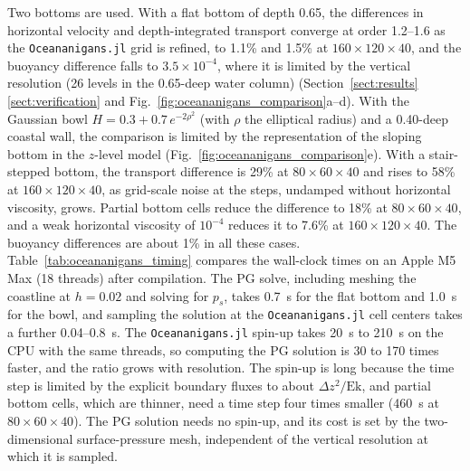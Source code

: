 \documentclass{ametsocV6.2}
\begin{document}
Two bottoms are used.
With a flat bottom of depth 0.65, the differences in horizontal velocity and depth-integrated transport converge at order 1.2--1.6 as the \texttt{Oceananigans.jl} grid is refined, to 1.1\% and 1.5\% at $160 \times 120 \times 40$, and the buoyancy difference falls to $3.5 \times 10^{-4}$, where it is limited by the vertical resolution (26 levels in the 0.65-deep water column) (Section~\ref{sect:results}\ref{sect:verification} and Fig.~\ref{fig:oceananigans_comparison}a--d).
With the Gaussian bowl $H = 0.3 + 0.7\, e^{-2\rho^2}$ (with $\rho$ the elliptical radius) and a 0.40-deep coastal wall, the comparison is limited by the representation of the sloping bottom in the $z$-level model (Fig.~\ref{fig:oceananigans_comparison}e).
With a stair-stepped bottom, the transport difference is 29\% at $80 \times 60 \times 40$ and rises to 58\% at $160 \times 120 \times 40$, as grid-scale noise at the steps, undamped without horizontal viscosity, grows.
Partial bottom cells reduce the difference to 18\% at $80 \times 60 \times 40$, and a weak horizontal viscosity of $10^{-4}$ reduces it to 7.6\% at $160 \times 120 \times 40$.
The buoyancy differences are about 1\% in all these cases.
Table~\ref{tab:oceananigans_timing} compares the wall-clock times on an Apple M5 Max (18 threads) after compilation.
The PG solve, including meshing the coastline at $h = 0.02$ and solving for $p_s$, takes 0.7~s for the flat bottom and 1.0~s for the bowl, and sampling the solution at the \texttt{Oceananigans.jl} cell centers takes a further 0.04--0.8~s.
The \texttt{Oceananigans.jl} spin-up takes 20~s to 210~s on the CPU with the same threads, so computing the PG solution is 30 to 170 times faster, and the ratio grows with resolution.
The spin-up is long because the time step is limited by the explicit boundary fluxes to about $\Delta z^2/\mathrm{Ek}$, and partial bottom cells, which are thinner, need a time step four times smaller (460~s at $80 \times 60 \times 40$).
The PG solution needs no spin-up, and its cost is set by the two-dimensional surface-pressure mesh, independent of the vertical resolution at which it is sampled.
\end{document}
